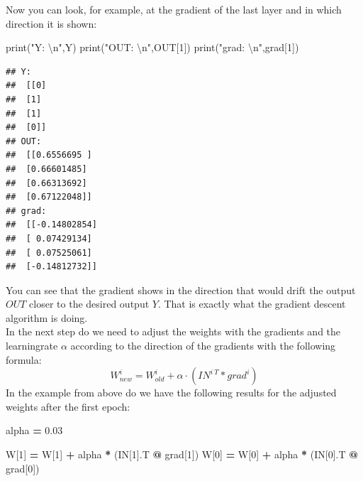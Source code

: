 \documentclass[
]{book}
\newenvironment{Shaded}{\begin{snugshade}}{\end{snugshade}}
\newcommand{\BuiltInTok}[1]{#1}
\newcommand{\CharTok}[1]{\textcolor[rgb]{0.31,0.60,0.02}{#1}}
\newcommand{\DecValTok}[1]{\textcolor[rgb]{0.00,0.00,0.81}{#1}}
\newcommand{\FloatTok}[1]{\textcolor[rgb]{0.00,0.00,0.81}{#1}}
\newcommand{\NormalTok}[1]{#1}
\newcommand{\OperatorTok}[1]{\textcolor[rgb]{0.81,0.36,0.00}{\textbf{#1}}}
\newcommand{\StringTok}[1]{\textcolor[rgb]{0.31,0.60,0.02}{#1}}
\begin{document}
Now you can look, for example, at the gradient of the last layer and in which direction it is shown:

\begin{Shaded}
\begin{Highlighting}[]
\BuiltInTok{print}\NormalTok{(}\StringTok{"Y: }\CharTok{\textbackslash{}n}\StringTok{"}\NormalTok{,Y)}
\BuiltInTok{print}\NormalTok{(}\StringTok{"OUT: }\CharTok{\textbackslash{}n}\StringTok{"}\NormalTok{,OUT[}\DecValTok{1}\NormalTok{])}
\BuiltInTok{print}\NormalTok{(}\StringTok{"grad: }\CharTok{\textbackslash{}n}\StringTok{"}\NormalTok{,grad[}\DecValTok{1}\NormalTok{])}
\end{Highlighting}
\end{Shaded}

\begin{verbatim}
## Y: 
##  [[0]
##  [1]
##  [1]
##  [0]]
## OUT: 
##  [[0.6556695 ]
##  [0.66601485]
##  [0.66313692]
##  [0.67122048]]
## grad: 
##  [[-0.14802854]
##  [ 0.07429134]
##  [ 0.07525061]
##  [-0.14812732]]
\end{verbatim}

You can see that the gradient shows in the direction that would drift the output \(OUT\) closer to the desired output \(Y\). That is exactly what the gradient descent algorithm is doing.\\
In the next step do we need to adjust the weights with the gradients and the learningrate \(\alpha\) according to the direction of the gradients with the following formula:
\[
  W^i_{new} = W^i_{old} + \alpha \cdot ( IN^{i\ T} * grad^i) 
\]
In the example from above do we have the following results for the adjusted weights after the first epoch:

\begin{Shaded}
\begin{Highlighting}[]
\NormalTok{alpha }\OperatorTok{=} \FloatTok{0.03}

\NormalTok{W[}\DecValTok{1}\NormalTok{] }\OperatorTok{=}\NormalTok{ W[}\DecValTok{1}\NormalTok{] }\OperatorTok{+}\NormalTok{ alpha }\OperatorTok{*}\NormalTok{ (IN[}\DecValTok{1}\NormalTok{].T }\OperatorTok{@}\NormalTok{ grad[}\DecValTok{1}\NormalTok{]) }
\NormalTok{W[}\DecValTok{0}\NormalTok{] }\OperatorTok{=}\NormalTok{ W[}\DecValTok{0}\NormalTok{] }\OperatorTok{+}\NormalTok{ alpha }\OperatorTok{*}\NormalTok{ (IN[}\DecValTok{0}\NormalTok{].T }\OperatorTok{@}\NormalTok{ grad[}\DecValTok{0}\NormalTok{]) }
\end{Highlighting}
\end{Shaded}
\end{document}
